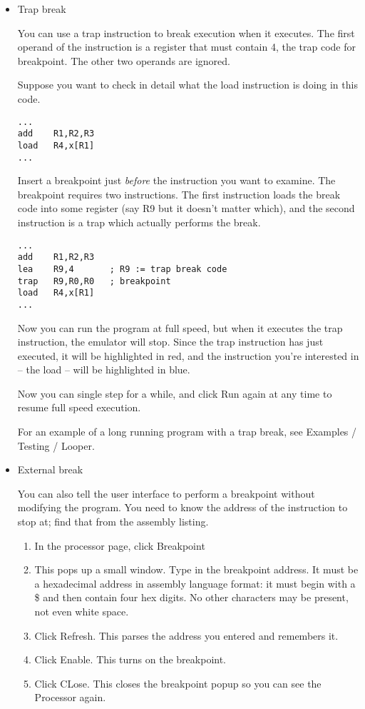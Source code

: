 \documentclass[11pt]{article}
\begin{document}
\begin{itemize}
\begin{itemize}
\item Trap break
\label{sec:org3c9bf3e}

You can use a trap instruction to break execution when it executes.
The first operand of the instruction is a register that must contain
4, the trap code for breakpoint.  The other two operands are ignored.

Suppose you want to check in detail what the load instruction is doing
in this code.

\begin{verbatim}
...
add    R1,R2,R3
load   R4,x[R1]
...
\end{verbatim}

Insert a breakpoint just \emph{before} the instruction you want to examine.
The breakpoint requires two instructions.  The first instruction loads
the break code into some register (say R9 but it doesn't matter
which), and the second instruction is a trap which actually performs
the break.

\begin{verbatim}
...
add    R1,R2,R3
lea    R9,4       ; R9 := trap break code
trap   R9,R0,R0   ; breakpoint
load   R4,x[R1]
...
\end{verbatim}

Now you can run the program at full speed, but when it executes the
trap instruction, the emulator will stop.  Since the trap instruction
has just executed, it will be highlighted in red, and the instruction
you're interested in -- the load -- will be highlighted in blue.

Now you can single step for a while, and click Run again at any time
to resume full speed execution.

For an example of a long running program with a trap break, see
Examples / Testing / Looper.

\item External break
\label{sec:orgd58816e}

You can also tell the user interface to perform a breakpoint without
modifying the program.  You need to know the address of the
instruction to stop at; find that from the assembly listing.

\begin{enumerate}
\item In the processor page, click Breakpoint
\item This pops up a small window.  Type in the breakpoint address.  It
must be a hexadecimal address in assembly language format: it must
begin with a \$ and then contain four hex digits.  No other
characters may be present, not even white space.
\item Click Refresh.  This parses the address you entered and remembers
it.
\item Click Enable.  This turns on the breakpoint.
\item Click CLose.  This closes the breakpoint popup so you can see the
Processor again.
\end{enumerate}


\end{itemize}
\end{itemize}
\end{document}
